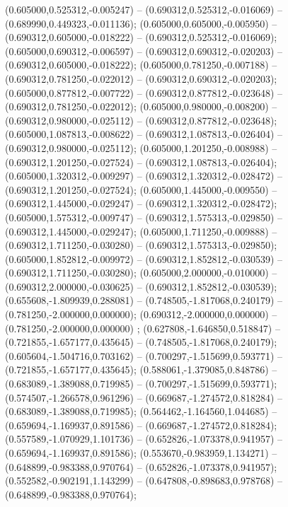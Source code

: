  (0.605000,0.525312,-0.005247) -- (0.690312,0.525312,-0.016069) -- (0.689990,0.449323,-0.011136);
 (0.605000,0.605000,-0.005950) -- (0.690312,0.605000,-0.018222) -- (0.690312,0.525312,-0.016069);
 (0.605000,0.690312,-0.006597) -- (0.690312,0.690312,-0.020203) -- (0.690312,0.605000,-0.018222);
 (0.605000,0.781250,-0.007188) -- (0.690312,0.781250,-0.022012) -- (0.690312,0.690312,-0.020203);
 (0.605000,0.877812,-0.007722) -- (0.690312,0.877812,-0.023648) -- (0.690312,0.781250,-0.022012);
 (0.605000,0.980000,-0.008200) -- (0.690312,0.980000,-0.025112) -- (0.690312,0.877812,-0.023648);
 (0.605000,1.087813,-0.008622) -- (0.690312,1.087813,-0.026404) -- (0.690312,0.980000,-0.025112);
 (0.605000,1.201250,-0.008988) -- (0.690312,1.201250,-0.027524) -- (0.690312,1.087813,-0.026404);
 (0.605000,1.320312,-0.009297) -- (0.690312,1.320312,-0.028472) -- (0.690312,1.201250,-0.027524);
 (0.605000,1.445000,-0.009550) -- (0.690312,1.445000,-0.029247) -- (0.690312,1.320312,-0.028472);
 (0.605000,1.575312,-0.009747) -- (0.690312,1.575313,-0.029850) -- (0.690312,1.445000,-0.029247);
 (0.605000,1.711250,-0.009888) -- (0.690312,1.711250,-0.030280) -- (0.690312,1.575313,-0.029850);
 (0.605000,1.852812,-0.009972) -- (0.690312,1.852812,-0.030539) -- (0.690312,1.711250,-0.030280);
 (0.605000,2.000000,-0.010000) -- (0.690312,2.000000,-0.030625) -- (0.690312,1.852812,-0.030539);
 (0.655608,-1.809939,0.288081) -- (0.748505,-1.817068,0.240179) -- (0.781250,-2.000000,0.000000);
 (0.690312,-2.000000,0.000000) -- (0.781250,-2.000000,0.000000) ;
 (0.627808,-1.646850,0.518847) -- (0.721855,-1.657177,0.435645) -- (0.748505,-1.817068,0.240179);
 (0.605604,-1.504716,0.703162) -- (0.700297,-1.515699,0.593771) -- (0.721855,-1.657177,0.435645);
 (0.588061,-1.379085,0.848786) -- (0.683089,-1.389088,0.719985) -- (0.700297,-1.515699,0.593771);
 (0.574507,-1.266578,0.961296) -- (0.669687,-1.274572,0.818284) -- (0.683089,-1.389088,0.719985);
 (0.564462,-1.164560,1.044685) -- (0.659694,-1.169937,0.891586) -- (0.669687,-1.274572,0.818284);
 (0.557589,-1.070929,1.101736) -- (0.652826,-1.073378,0.941957) -- (0.659694,-1.169937,0.891586);
 (0.553670,-0.983959,1.134271) -- (0.648899,-0.983388,0.970764) -- (0.652826,-1.073378,0.941957);
 (0.552582,-0.902191,1.143299) -- (0.647808,-0.898683,0.978768) -- (0.648899,-0.983388,0.970764);
